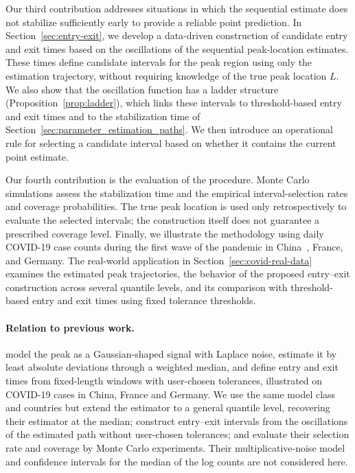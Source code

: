 \documentclass[12pt,a4paper]{article}
\begin{document}
Our third contribution addresses situations in which the sequential estimate
does not stabilize sufficiently early to provide a reliable point prediction.
In Section~\ref{sec:entry-exit}, we develop a data-driven construction of
candidate entry and exit times based on the oscillations of the sequential
peak-location estimates. These times define candidate intervals for the peak
region using only the estimation trajectory, without requiring knowledge of the
true peak location \(L\). We also show that the oscillation function has a
ladder structure (Proposition~\ref{prop:ladder}), which links these intervals to
threshold-based entry and exit times and to the stabilization time of
Section~\ref{sec:parameter_estimation_paths}. We then introduce an operational
rule for selecting a candidate interval based on whether it contains the current
point estimate.

Our fourth contribution is the evaluation of the procedure. Monte Carlo
simulations assess the stabilization time and the empirical interval-selection
rates and coverage probabilities. The true peak location is used only
retrospectively to evaluate the selected intervals; the construction itself does
not guarantee a prescribed coverage level. Finally, we illustrate the
methodology using daily COVID-19 case counts during the first wave of the
pandemic in China~\citep{Bar20}, France, and Germany.
The real-world application in Section~\ref{sec:covid-real-data} examines the
estimated peak trajectories, the behavior of the proposed entry--exit
construction across several quantile levels, and its comparison with
threshold-based entry and exit times using fixed tolerance thresholds.

\paragraph{Relation to previous work.}
\citet{Der25} model the peak as a Gaussian-shaped signal with Laplace noise,
estimate it by least absolute deviations through a weighted median, and define
entry and exit times from fixed-length windows with user-chosen tolerances,
illustrated on COVID-19 cases in China, France and Germany. We use the same
model class and countries but extend the estimator to a general quantile level,
recovering their estimator at the median; construct entry--exit intervals from
the oscillations of the estimated path without user-chosen tolerances; and
evaluate their selection rate and coverage by Monte Carlo experiments. Their
multiplicative-noise model and confidence intervals for the median of the log
counts are not considered here.
\end{document}
